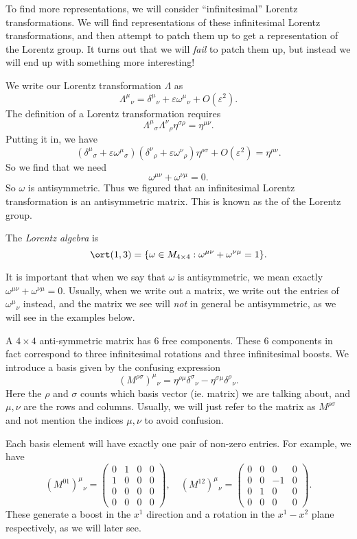 \documentclass[a4paper]{article}
\begin{document}
To find more representations, we will consider ``infinitesimal'' Lorentz transformations. We will find representations of these infinitesimal Lorentz transformations, and then attempt to patch them up to get a representation of the Lorentz group. It turns out that we will \emph{fail} to patch them up, but instead we will end up with something more interesting!

We write our Lorentz transformation $\Lambda$ as
\[
  \Lambda^\mu\!_\nu = \delta^\mu\!_\nu + \varepsilon \omega^\mu\!_\nu + O(\varepsilon^2).
\]
The definition of a Lorentz transformation requires
\[
  \Lambda^\mu\!_\sigma \Lambda^\nu\!_\rho \eta^{\sigma \rho} = \eta^{\mu\nu}.
\]
Putting it in, we have
\[
  (\delta^\mu\!_\sigma + \varepsilon \omega^\mu\!_\sigma) (\delta^\nu\!_\rho + \varepsilon \omega^\nu\!_\rho) \eta^{\rho\sigma} + O(\varepsilon^2) = \eta^{\mu\nu}.
\]
So we find that we need
\[
  \omega^{\mu\nu} + \omega^{\nu\mu} = 0.
\]
So $\omega$ is antisymmetric. Thus we figured that an infinitesimal Lorentz transformation is an antisymmetric matrix. This is known as the  of the Lorentz group.
\begin{defi}
  The \emph{Lorentz algebra} is
  \[
    \ort(1, 3) = \{\omega \in M_{4 \times 4}: \omega^{\mu\nu} + \omega^{\nu\mu} = 1\}.
  \]
\end{defi}
It is important that when we say that $\omega$ is antisymmetric, we mean exactly $\omega^{\mu\nu} + \omega^{\nu\mu} = 0$. Usually, when we write out a matrix, we write out the entries of $\omega^\mu\!_\nu$ instead, and the matrix we see will \emph{not} in general be antisymmetric, as we will see in the examples below.

A $4 \times 4$ anti-symmetric matrix has $6$ free components. These $6$ components in fact correspond to three infinitesimal rotations and three infinitesimal boosts. We introduce a basis given by the confusing expression
\[
  (M^{\rho\sigma})^\mu\!_\nu = \eta^{\rho\mu}\delta^\sigma\!_\nu - \eta^{\sigma\mu}\delta^{\rho}\!_\nu.
\]
Here the $\rho$ and $\sigma$ counts which basis vector (ie. matrix) we are talking about, and $\mu, \nu$ are the rows and columns. Usually, we will just refer to the matrix as $M^{\rho\sigma}$ and not mention the indices $\mu, \nu$ to avoid confusion.

Each basis element will have exactly one pair of non-zero entries. For example, we have
\[
  (M^{01})^\mu\!_\nu =
  \begin{pmatrix}
   0 & 1 & 0 & 0\\
   1 & 0 & 0 & 0\\
   0 & 0 & 0 & 0\\
   0 & 0 & 0 & 0
  \end{pmatrix},\quad
  (M^{12})^\mu\!_\nu =
  \begin{pmatrix}
    0 & 0 & 0 & 0\\
    0 & 0 & -1 & 0\\
    0 & 1 & 0 & 0\\
    0 & 0 & 0 & 0
  \end{pmatrix}.
\]
These generate a boost in the $x^1$ direction and a rotation in the $x^1-x^2$ plane respectively, as we will later see.
\end{document}
